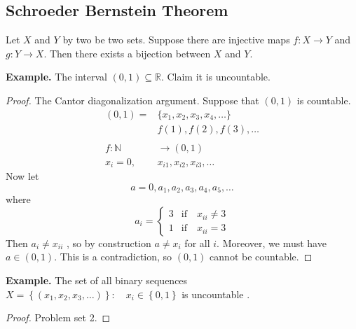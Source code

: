 \documentclass{article}
\theoremstyle{remark}
\begin{document}
\subsection{Schroeder Bernstein Theorem}%
\label{sub:schroeder_bernstein_theorem}

Let $X$ and $Y$ by two be two sets. Suppose there are injective maps $f: X \to Y$ and $g: Y \to X$. Then there exists a bijection between $X$ and $Y$. 

\begin{tcolorbox}
  \textbf{Example.} The interval $\left( 0,1 \right) \subseteq  \mathbb{R} $. Claim it is uncountable.  
  \begin{proof}
    The Cantor diagonalization argument. Suppose that $\left( 0,1 \right) $ is countable. \[
      \begin{split}
        \left( 0,1 \right) = &\{x_{1}, x_{2}, x_{3}, x_{4} , \ldots\} \\
         & f\left( 1 \right), f\left( 2 \right) , f\left( 3 \right), \ldots\\
         \\
      f: \mathbb{N}  & \to \left( 0,1 \right) \\
      x_{i} = 0,  & x_{i1}, x_{i2} , x_{i3}, \ldots 
      \end{split} 
    \] 
    Now let \[
    a = 0, a_{1}, a_{2}, a_{3}, a_{4}, a_{5}, \ldots
    \] 
    where \[
    a_{i} = \begin{cases}
      3 &  \text{if} \quad   x_{ii} \neq 3 \\
      1  & \text{if} \quad   x_{ii} =3  
    \end{cases}
    \] 
    Then $a_{i} \neq x_{ii} $ , so by construction $a \neq x_{i}$ for all $i$. Moreover, we must have $a \in \left( 0,1 \right)$. This is a contradiction, so $\left( 0,1 \right) $ cannot be countable. 
  \end{proof}
\end{tcolorbox}


\begin{tcolorbox}
  \textbf{Example.} The set of all binary sequences $ X = \left\{ \left( x_{1}, x_{2}, x_{3} , \ldots \right) \right\} : \quad  x_{i} \in \left\{ 0,1 \right\}  $
  is uncountable . 

  \begin{proof}
    Problem set 2.
  \end{proof}
\end{tcolorbox}
\end{document}
